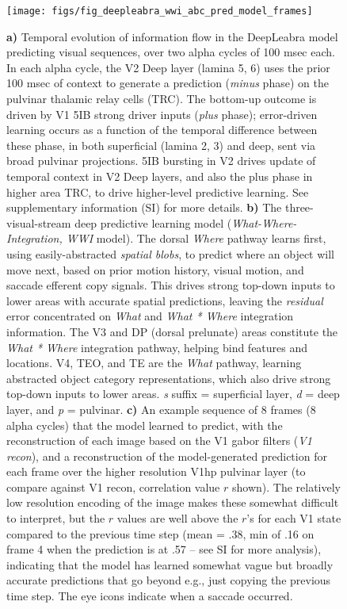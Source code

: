 \documentclass[12pt,twoside]{nature}
\newif\myifpdf
\begin{document}
\begin{figure}
  \centering\texttt{[image: figs/fig\_deepleabra\_wwi\_abc\_pred\_model\_frames]}
  \caption{\small {\bf a)} Temporal evolution of information flow in the DeepLeabra model predicting visual sequences, over two alpha cycles of 100 msec each.   In each alpha cycle, the V2 Deep layer (lamina 5, 6) uses the prior 100 msec of context to generate a prediction ({\em minus} phase) on the pulvinar thalamic relay cells (TRC). The bottom-up outcome is driven by V1 5IB strong driver inputs ({\em plus} phase); error-driven learning occurs as a function of the temporal difference between these phase, in both superficial (lamina 2, 3) and deep, sent via broad pulvinar projections. 5IB bursting in V2 drives update of temporal context in V2 Deep layers, and also the plus phase in higher area TRC, to drive higher-level predictive learning.  See supplementary information (SI) for more details. {\bf b)} The three-visual-stream deep predictive learning model ({\em What-Where-Integration, WWI} model). The dorsal {\em Where} pathway learns first, using easily-abstracted {\em spatial blobs}, to predict where an object will move next, based on prior motion history, visual motion, and saccade efferent copy signals.  This drives strong top-down inputs to lower areas with accurate spatial predictions, leaving the {\em residual} error concentrated on {\em What} and {\em What * Where} integration information.  The V3 and DP (dorsal prelunate) areas constitute the {\em What * Where} integration pathway, helping bind features and locations.  V4, TEO, and TE are the {\em What} pathway, learning abstracted object category representations, which also drive strong top-down inputs to lower areas.  {\em s} suffix = superficial layer, {\em d} = deep layer, and {\em p} = pulvinar. {\bf c)} An example sequence of 8 frames (8 alpha cycles) that the model learned to predict, with the reconstruction of each image based on the V1 gabor filters ({\em V1 recon}), and a reconstruction of the model-generated prediction for each frame over the higher resolution V1hp pulvinar layer (to compare against V1 recon, correlation value $r$ shown).  The relatively low resolution encoding of the image makes these somewhat difficult to interpret, but the $r$ values are well above the $r$'s for each V1 state compared to the previous time step (mean = .38, min of .16 on frame 4 when the prediction is at .57 -- see SI for more analysis), indicating that the model has learned somewhat vague but broadly accurate predictions that go beyond e.g., just copying the previous time step.  The eye icons indicate when a saccade occurred.}
  \label{fig.model}
\end{figure}
\end{document}
